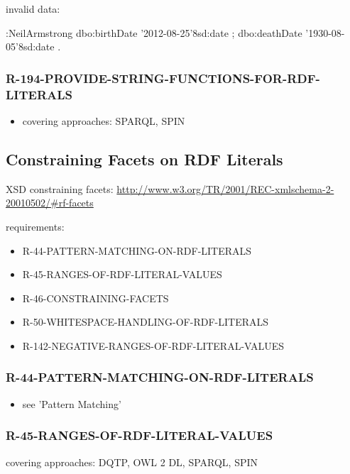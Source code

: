 \documentclass{llncs}
\begin{document}
invalid data:

\begin{ex}
:NeilArmstrong
    dbo:birthDate '2012-08-25'^^xsd:date ;
    dbo:deathDate '1930-08-05'^^xsd:date .
\end{ex}

\subsubsection{R-194-PROVIDE-STRING-FUNCTIONS-FOR-RDF-LITERALS}

\begin{itemize}
	\item covering approaches: SPARQL, SPIN
\end{itemize}

\subsection{Constraining Facets on RDF Literals}

XSD constraining facets: \url{http://www.w3.org/TR/2001/REC-xmlschema-2-20010502/#rf-facets}

requirements:

\begin{itemize}
	\item R-44-PATTERN-MATCHING-ON-RDF-LITERALS
	\item R-45-RANGES-OF-RDF-LITERAL-VALUES
	\item R-46-CONSTRAINING-FACETS
	\item R-50-WHITESPACE-HANDLING-OF-RDF-LITERALS
	\item R-142-NEGATIVE-RANGES-OF-RDF-LITERAL-VALUES
\end{itemize}

\subsubsection{R-44-PATTERN-MATCHING-ON-RDF-LITERALS}

\begin{itemize}
	\item see 'Pattern Matching'
\end{itemize}

\subsubsection{R-45-RANGES-OF-RDF-LITERAL-VALUES}

covering approaches: DQTP, OWL 2 DL, SPARQL, SPIN
\end{document}
